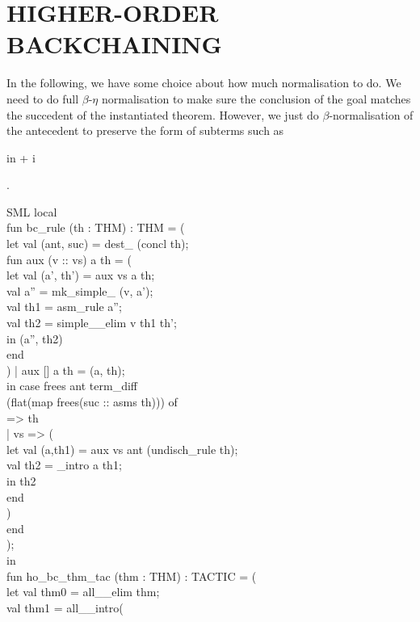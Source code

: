 \documentclass[11pt,a4paper]{article}
\begin{document}
\section{HIGHER-ORDER BACKCHAINING}

In the following, we have some choice about how much normalisation to do.
We need to do full $\beta$-$\eta$ normalisation to make sure the conclusion
of the goal matches the succedent of the instantiated theorem. However, we
just do $\beta$-normalisation of the antecedent to preserve the form of
subterms such as
\begin{INLINEFT}%
\+\PrMM{}i\PrLH{}n + i\\
\end{INLINEFT}%
.
\begin{GFT}{SML}
\+local\\
\+fun \PrNL{}bc\_rule\PrNN{} (th : THM) : THM = (\\
\+	let	val (ant, suc) = dest\_\PrLE{} (concl th);\\
\+		fun aux (v :: vs) a th = (\\
\+			let	val (a', th') = aux vs a th;\\
\+				val a'' = mk\_simple\_\PrLG{} (v, a');\\
\+				val th1 = asm\_rule a'';\\
\+				val th2 = simple\_\PrLG{}\_elim v th1 th';\\
\+			in	(a'', th2)\\
\+			end\\
\+		) | aux [] a th = (a, th);\\
\+	in	case frees ant term\_diff\\
\+		(flat(map frees(suc :: asms th))) of\\
\+		[] => th\\
\+		|	vs => (\\
\+			let	val (a,th1) = aux vs ant (undisch\_rule th);\\
\+				val th2 = \PrLE{}\_intro a th1;\\
\+			in	th2\\
\+			end\\
\+		)\\
\+	end\\
\+);\\
\+in\\
\+fun \PrNL{}ho\_bc\_thm\_tac\PrNN{} (thm : THM) : TACTIC = ( \\
\+	let	val thm0 = all\_\PrLF{}\_elim thm;\\
\+		val thm1 = all\_\PrLF{}\_intro(\\

\end{GFT}
\end{document}
